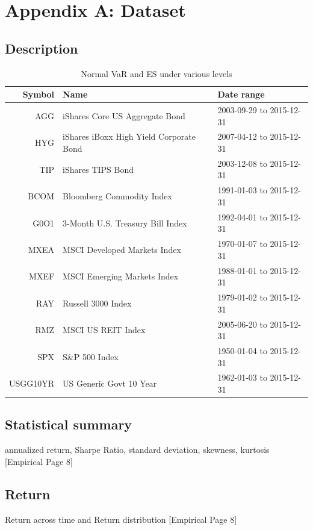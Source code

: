 \documentclass[11pt]{article}
\begin{document}
\newpage
\appendix
\section{Appendix A: Dataset} \label{App:AppendixA}
\subsection{Description}
\begin{table}[H]
\centering 
\begin{tabular}{ | r | p{7cm}  | p{4.5cm} | } 
 \hline 
Symbol & Name & Date range \\ \hline
AGG & iShares Core US Aggregate Bond & 2003-09-29 to 2015-12-31 \\
HYG & iShares iBoxx High Yield Corporate Bond & 2007-04-12 to 2015-12-31 \\
TIP & iShares TIPS Bond & 2003-12-08 to 2015-12-31 \\
BCOM & Bloomberg Commodity Index & 1991-01-03 to 2015-12-31 \\
G0O1 & 3-Month U.S. Treasury Bill Index & 1992-04-01 to 2015-12-31 \\
MXEA & MSCI Developed Markets Index & 1970-01-07 to 2015-12-31 \\
MXEF & MSCI Emerging Markets Index & 1988-01-01 to 2015-12-31 \\
RAY & Russell 3000 Index & 1979-01-02 to 2015-12-31 \\
RMZ & MSCI US REIT Index & 2005-06-20 to 2015-12-31 \\
SPX & S\&P 500 Index & 1950-01-04 to 2015-12-31 \\
USGG10YR & US Generic Govt 10 Year & 1962-01-03 to 2015-12-31 \\
 \hline
\end{tabular}
\caption{Normal VaR and ES under various levels}
\label{table:AssetDescription}
\end{table}


\subsection{Statistical summary}
annualized return, Sharpe Ratio, standard deviation, skewness, kurtosis [Empirical Page 8]

\subsection{Return}
Return across time and Return distribution [Empirical Page 8]
\end{document}
